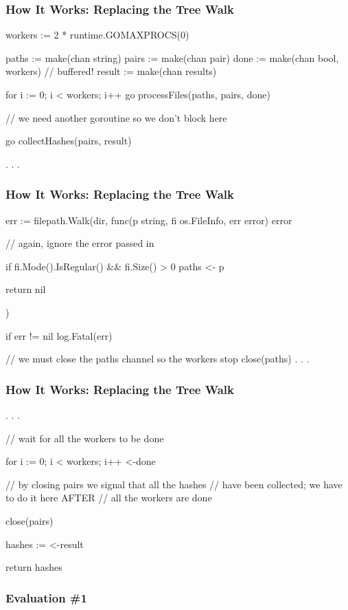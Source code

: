 \documentclass[handout,compress,t]{beamer}
\begin{document}
\begin{frame}[fragile]
    \frametitle{How It Works: Replacing the Tree Walk}
\begin{golang}
workers := 2 * runtime.GOMAXPROCS(0)

paths := make(chan string)
pairs := make(chan pair)
done := make(chan bool, workers)  // buffered!
result := make(chan results)

for i := 0; i < workers; i++ {
	go processFiles(paths, pairs, done)
}

// we need another goroutine so we don't block here

go collectHashes(pairs, result)

. . .
\end{golang}
\end{frame}

\begin{frame}[fragile]
    \frametitle{How It Works: Replacing the Tree Walk}
\begin{golang}
err := filepath.Walk(dir, func(p string, fi os.FileInfo,
                               err error) error {
	// again, ignore the error passed in

	if fi.Mode().IsRegular() && fi.Size() > 0 {
		paths <- p
	}

	return nil
})

if err != nil {
    log.Fatal(err)
}

// we must close the paths channel so the workers stop
close(paths)
. . .
\end{golang}
\end{frame}

\begin{frame}[fragile]
    \frametitle{How It Works: Replacing the Tree Walk}
\begin{golang}
. . .

// wait for all the workers to be done

for i := 0; i < workers; i++ {
	<-done
}

// by closing pairs we signal that all the hashes
// have been collected; we have to do it here AFTER
// all the workers are done

close(pairs)

hashes := <-result

return hashes
\end{golang}
\end{frame}

\begin{frame}
    \frametitle{Evaluation \#1}
    \vspace{\baselineskip}
    \vspace{\baselineskip}
    \vspace{2\baselineskip}
    \vspace{\baselineskip}
\end{frame}
\end{document}
